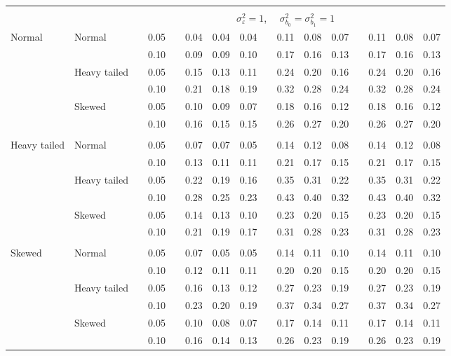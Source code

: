 \documentclass[11pt]{article} %
\begin{document}
\begin{table}[ht]
\begin{scriptsize}
\begin{center}
\begin{tabular}{ll p{.1cm} c p{.1cm} rrr p{.1cm} rrr p{.1cm} rrr}
&&&&&&&&&&&&&&&\\
& && && \multicolumn{9}{c}{$\sigma_{\varepsilon}^2 = 1$, \ \ $\sigma_{b_0}^2 = \sigma_{b_1}^2 = 1$} \\ \cline{6-16}
Normal       & Normal       && 0.05 &&  0.04 & 0.04 & 0.04 && 0.11 & 0.08 & 0.07 && 0.11 & 0.08 & 0.07 \\ 
             &              && 0.10 &&  0.09 & 0.09 & 0.10 && 0.17 & 0.16 & 0.13 && 0.17 & 0.16 & 0.13 \\ 
             & Heavy tailed && 0.05 &&  0.15 & 0.13 & 0.11 && 0.24 & 0.20 & 0.16 && 0.24 & 0.20 & 0.16 \\ 
             &              && 0.10 &&  0.21 & 0.18 & 0.19 && 0.32 & 0.28 & 0.24 && 0.32 & 0.28 & 0.24 \\ 
             & Skewed       && 0.05 &&  0.10 & 0.09 & 0.07 && 0.18 & 0.16 & 0.12 && 0.18 & 0.16 & 0.12 \\ 
             &              && 0.10 &&  0.16 & 0.15 & 0.15 && 0.26 & 0.27 & 0.20 && 0.26 & 0.27 & 0.20 \\ 
             &&&&&&&&&&&&&&&\\
Heavy tailed & Normal       && 0.05 &&  0.07 & 0.07 & 0.05 && 0.14 & 0.12 & 0.08 && 0.14 & 0.12 & 0.08 \\ 
             &              && 0.10 &&  0.13 & 0.11 & 0.11 && 0.21 & 0.17 & 0.15 && 0.21 & 0.17 & 0.15 \\ 
             & Heavy tailed && 0.05 &&  0.22 & 0.19 & 0.16 && 0.35 & 0.31 & 0.22 && 0.35 & 0.31 & 0.22 \\ 
             &              && 0.10 &&  0.28 & 0.25 & 0.23 && 0.43 & 0.40 & 0.32 && 0.43 & 0.40 & 0.32 \\ 
             & Skewed       && 0.05 &&  0.14 & 0.13 & 0.10 && 0.23 & 0.20 & 0.15 && 0.23 & 0.20 & 0.15 \\ 
             &              && 0.10 &&  0.21 & 0.19 & 0.17 && 0.31 & 0.28 & 0.23 && 0.31 & 0.28 & 0.23 \\ 
             &&&&&&&&&&&&&&&\\
Skewed       & Normal       && 0.05 &&  0.07 & 0.05 & 0.05 && 0.14 & 0.11 & 0.10 && 0.14 & 0.11 & 0.10 \\ 
             &              && 0.10 &&  0.12 & 0.11 & 0.11 && 0.20 & 0.20 & 0.15 && 0.20 & 0.20 & 0.15 \\ 
             & Heavy tailed && 0.05 &&  0.16 & 0.13 & 0.12 && 0.27 & 0.23 & 0.19 && 0.27 & 0.23 & 0.19 \\ 
             &              && 0.10 &&  0.23 & 0.20 & 0.19 && 0.37 & 0.34 & 0.27 && 0.37 & 0.34 & 0.27 \\ 
             & Skewed       && 0.05 &&  0.10 & 0.08 & 0.07 && 0.17 & 0.14 & 0.11 && 0.17 & 0.14 & 0.11 \\ 
             &              && 0.10 &&  0.16 & 0.14 & 0.13 && 0.26 & 0.23 & 0.19 && 0.26 & 0.23 & 0.19 \\ 



\end{tabular}
\end{center}
\end{scriptsize}
\end{table}
\end{document}
